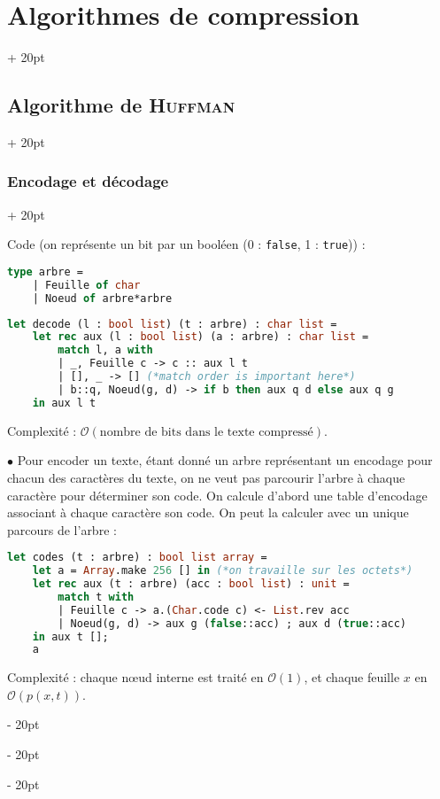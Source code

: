 \documentclass[a4paper, 12pt, twoside]{article}
\newcommand{\ind}[1][20pt]{\advance\leftskip + #1}
\newcommand{\deind}[1][20pt]{\advance\leftskip - #1}
\newenvironment{indt}[2][20pt]{#2 \par \ind[#1]}{\par \deind} %
\begin{document}
\begin{indt}{\section{Algorithmes de compression}}
\begin{indt}{\subsection{Algorithme de \textsc{Huffman}}}
\begin{indt}{\subsubsection{Encodage et décodage}}
                \vspace{6pt}
                
                Code (on représente un bit par un booléen (0 : \texttt{false}, 1 : \texttt{true})) :
                
                \vspace{12pt}

                \begin{lstlisting}[language=Caml, xleftmargin=80pt]
type arbre =
    | Feuille of char
    | Noeud of arbre*arbre\end{lstlisting}
                
                \newpage
                
                \begin{lstlisting}[language=Caml, xleftmargin=80pt]
let decode (l : bool list) (t : arbre) : char list =
    let rec aux (l : bool list) (a : arbre) : char list =
        match l, a with
        | _, Feuille c -> c :: aux l t
        | [], _ -> [] (*match order is important here*)
        | b::q, Noeud(g, d) -> if b then aux q d else aux q g
    in aux l t\end{lstlisting}

                Complexité : $\mathcal O(\text{nombre de bits dans le texte compressé})$.

                \vspace{12pt}
                
                $\bullet$ Pour encoder un texte, étant donné un arbre représentant un encodage pour chacun des caractères du texte, on ne veut pas parcourir l'arbre à chaque caractère pour déterminer son code. On calcule d'abord une table d'encodage associant à chaque caractère son code. On peut la calculer avec un unique parcours de l'arbre :

                \begin{lstlisting}[language=Caml, xleftmargin=80pt]
let codes (t : arbre) : bool list array =
    let a = Array.make 256 [] in (*on travaille sur les octets*)
    let rec aux (t : arbre) (acc : bool list) : unit =
        match t with
        | Feuille c -> a.(Char.code c) <- List.rev acc
        | Noeud(g, d) -> aux g (false::acc) ; aux d (true::acc)
    in aux t [];
    a\end{lstlisting}

                Complexité : chaque n\oe ud interne est traité en $\mathcal O(1)$, et chaque feuille $x$ en $\mathcal O(p(x ,t))$.


\end{indt}
\end{indt}
\end{indt}
\end{document}
